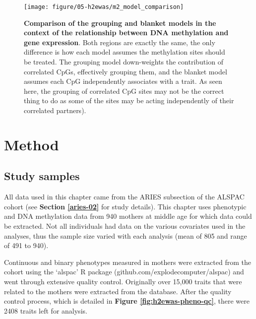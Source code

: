\documentclass[11pt,oneside]{bristolthesis}
\begin{document}
\begin{figure}

{\centering \texttt{[image: figure/05-h2ewas/m2\_model\_comparison]} 

}

\caption[Comparison of the grouping and blanket models in the context of the relationship between DNA methylation and gene expression]{\textbf{Comparison of the grouping and blanket models in the context of the relationship between DNA methylation and gene expression}. Both regions are exactly the same, the only difference is how each model assumes the methylation sites should be treated. The grouping model down-weights the contribution of correlated CpGs, effectively grouping them, and the blanket model assumes each CpG independently associates with a trait. As seen here, the grouping of correlated CpG sites may not be the correct thing to do as some of the sites may be acting independently of their correlated partners).}\label{fig:h2ewas-model-comp}
\end{figure}
\hypertarget{method-05}{%
\section{Method}\label{method-05}}

\hypertarget{study-samples-05}{%
\subsection{Study samples}\label{study-samples-05}}

All data used in this chapter came from the ARIES subsection of the ALSPAC cohort (see \textbf{Section \ref{aries-02}} for study details). This chapter uses phenotypic and DNA methylation data from 940 mothers at middle age for which data could be extracted. Not all individuals had data on the various covariates used in the analyses, thus the sample size varied with each analysis (mean of 805 and range of 491 to 940).

Continuous and binary phenotypes measured in mothers were extracted from the cohort using the `alspac' R package (github.com/explodecomputer/alspac) and went through extensive quality control. Originally over 15,000 traits that were related to the mothers were extracted from the database. After the quality control process, which is detailed in \textbf{Figure \ref{fig:h2ewas-pheno-qc}}, there were 2408 traits left for analysis.
\end{document}
